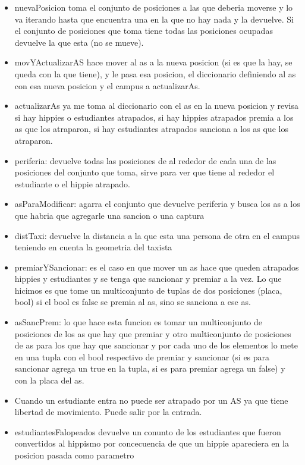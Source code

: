 \documentclass[10pt, a4paper]{article}
\begin{document}
\begin{itemize}

\item nuevaPosicion toma el conjunto de posiciones a las que deberia moverse y lo va iterando hasta que encuentra una en la que no hay nada y la devuelve. Si el conjunto de posiciones que toma tiene todas las posiciones ocupadas devuelve la que esta (no se mueve).
\item movYActualizarAS hace mover al as a la nueva posicion (si es que la hay, se queda con la que tiene), y le pasa esa posicion, el diccionario definiendo al as con esa nueva posicion y el campus a actualizarAs.
\item actualizarAs ya me toma al diccionario con el as en la nueva posicion y revisa si hay hippies o estudiantes atrapados, si hay hippies atrapados premia a los as que los atraparon, si hay estudiantes atrapados sanciona a los as que los atraparon.
\item periferia: devuelve todas las posiciones de al rededor de cada una de las posiciones del conjunto que toma, sirve para ver que tiene al rededor el estudiante o el hippie atrapado.
\item asParaModificar: agarra el conjunto que devuelve periferia y busca los as a los que habria que agregarle una sancion o una captura
\item distTaxi: devuelve la distancia a la que esta una persona de otra en el campus teniendo en cuenta la geometria del taxista
\item premiarYSancionar: es el caso en que mover un as hace que queden atrapados hippies y estudiantes y se tenga que sancionar y premiar a la vez. Lo que hicimos es que tome un multiconjunto de tuplas de dos posiciones (placa, bool) si el bool es false se premia al as, sino se sanciona a ese as.
\item asSancPrem: lo que hace esta funcion es tomar un multiconjunto de posiciones de los as que hay que premiar y otro multiconjunto de posiciones de as para los que hay que sancionar y por cada uno de los elementos lo mete en una tupla con el bool respectivo de premiar y sancionar (si es para sancionar agrega un true en la tupla, si es para premiar agrega un false) y con la placa del as.
\item Cuando un estudiante entra no puede ser atrapado por un AS ya que tiene libertad de movimiento. Puede salir por la entrada.
\item estudiantesFalopeados devuelve un conunto de los estudiantes que fueron convertidos al hippismo por concecuencia de que un hippie apareciera en la posicion pasada como parametro

\end{itemize}
\end{document}
